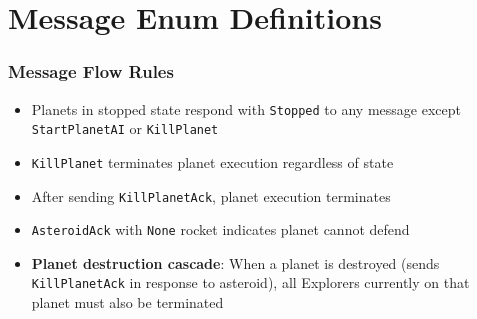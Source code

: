 \documentclass[12pt,a4paper]{article}
\newcommand{\important}[1]{\textbf{\textcolor{accent}{#1}}}
\newcommand{\code}[1]{\texttt{\textcolor{secondary}{#1}}}
\begin{document}
\section{Message Enum Definitions}


\subsubsection{Message Flow Rules}
\begin{itemize}
    \item Planets in stopped state respond with \code{Stopped} to any message except \code{StartPlanetAI} or \code{KillPlanet}
    \item \code{KillPlanet} terminates planet execution regardless of state
    \item After sending \code{KillPlanetAck}, planet execution terminates
    \item \code{AsteroidAck} with \code{None} rocket indicates planet cannot defend
    \item \important{Planet destruction cascade}: When a planet is destroyed (sends \code{KillPlanetAck} in response to asteroid), all Explorers currently on that planet must also be terminated
\end{itemize}
\end{document}
